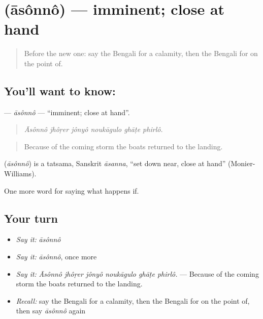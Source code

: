 \section[\texorpdfstring{\bn{আসন্ন} (āsônnô)}{আসন্ন (āsônnô)}]{ (āsônnô) — imminent; close at hand}

\label{lesson:BN-C538-asonno}



\begin{quote}
Before the new one: say the Bengali for a calamity, then the Bengali for on the point of.
\end{quote}

\subsection*{You'll want to know: }
\textbf{} — \emph{āsônnô} — \textquotedblleft{}imminent; close at hand\textquotedblright{}.

\begin{quote}
     
\end{quote}

\begin{quote}
\emph{Āsônnô jhôṛer jônyô noukāgulo ghāṭe phirlô.}
\end{quote}

\begin{quote}
Because of the coming storm the boats returned to the landing.
\end{quote}

\begin{cousinweb}
\textbf{} (\emph{āsônnô}) is a tatsama, Sanskrit \emph{āsanna}, \textquotedblleft{}set down near, close at hand\textquotedblright{} (Monier-Williams).
\end{cousinweb}

\begin{grammarlens}[title={What you've built}]
One more word for saying what happens if.
\end{grammarlens}

\subsection*{Your turn}
\begin{itemize}
\raggedright
  \item \emph{Say it:} \emph{āsônnô}
  \item \emph{Say it:} \emph{āsônnô}, once more
  \item \emph{Say it:} \emph{Āsônnô jhôṛer jônyô noukāgulo ghāṭe phirlô.} — Because of the coming storm the boats returned to the landing.
  \item \emph{Recall:} say the Bengali for a calamity, then the Bengali for on the point of, then say \emph{āsônnô} again
\end{itemize}


